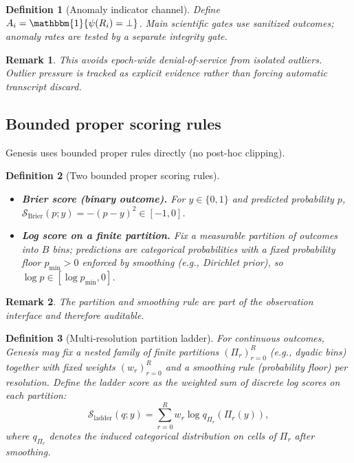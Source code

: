 \documentclass[11pt,a4paper]{article}
\newtheorem{definition}{Definition}[section]
\newtheorem{remark}{Remark}[section]
\begin{document}
\begin{definition}[Anomaly indicator channel]
Define $A_i=\mathbbm{1}\{\psi(R_i)=\bot\}$.
Main scientific gates use sanitized outcomes; anomaly rates are tested by a separate integrity gate.
\end{definition}

\begin{remark}
This avoids epoch-wide denial-of-service from isolated outliers.
Outlier pressure is tracked as explicit evidence rather than forcing automatic transcript discard.
\end{remark}

\subsection{Bounded proper scoring rules}
Genesis uses bounded proper rules directly (no post-hoc clipping).

\begin{definition}[Two bounded proper scoring rules]
\begin{itemize}[leftmargin=*]
\item \textbf{Brier score (binary outcome).} For $y\in\{0,1\}$ and predicted probability $p$, $\mathcal{S}_{\mathrm{Brier}}(p;y)=-(p-y)^2\in[-1,0]$.
\item \textbf{Log score on a finite partition.} Fix a measurable partition of outcomes into $B$ bins; predictions are categorical probabilities with a fixed probability floor $p_{\min}>0$ enforced by smoothing (e.g., Dirichlet prior), so $\log p \in[\log p_{\min},0]$.
\end{itemize}
\end{definition}

\begin{remark}
The partition and smoothing rule are part of the observation interface and therefore auditable.
\end{remark}

\begin{definition}[Multi-resolution partition ladder]
For continuous outcomes, Genesis may fix a nested family of finite partitions $(\Pi_r)_{r=0}^R$ (e.g., dyadic bins) together with fixed weights $(w_r)_{r=0}^R$ and a smoothing rule (probability floor) per resolution.
Define the \emph{ladder score} as the weighted sum of discrete log scores on each partition:
\[
\mathcal{S}_{\mathrm{ladder}}(q;y)=\sum_{r=0}^R w_r \log q_{\Pi_r}(\Pi_r(y)),
\]
where $q_{\Pi_r}$ denotes the induced categorical distribution on cells of $\Pi_r$ after smoothing.
\end{definition}
\end{document}
